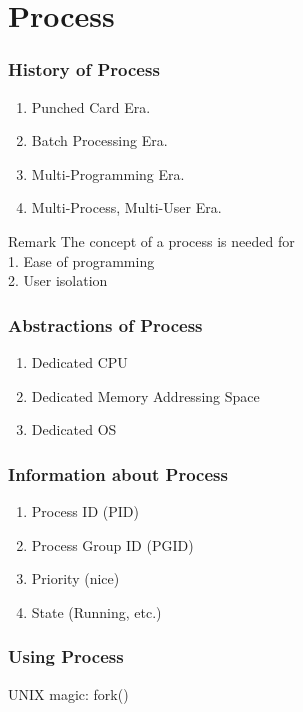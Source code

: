 \section[Process]{Process}

\begin{frame}
    \frametitle{History of Process}
    \begin{enumerate}
        \item Punched Card Era.
        \item Batch Processing Era.
        \item Multi-Programming Era.
        \item Multi-Process, Multi-User Era.
    \end{enumerate}

    \vspace{2em}

    \begin{alertblock}{Remark}
        The concept of a process is needed for \\
        1. Ease of programming \\
        2. User isolation
    \end{alertblock}
\end{frame}

\begin{frame}
    \frametitle{Abstractions of Process}
    \begin{enumerate}
        \item Dedicated CPU
        \item Dedicated Memory Addressing Space
        \item Dedicated OS
    \end{enumerate}
\end{frame}

\begin{frame}
    \frametitle{Information about Process}
    \begin{enumerate}
        \item Process ID (PID)
        \item Process Group ID (PGID)
        \item Priority (nice)
        \item State (Running, etc.)
    \end{enumerate}
\end{frame}

\begin{frame}
    \frametitle{Using Process}
    UNIX magic: fork()
\end{frame}

